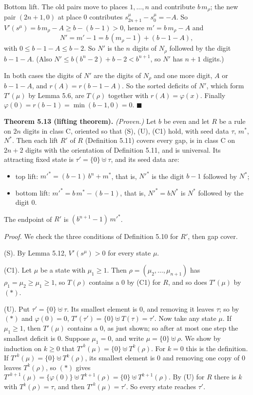 \documentclass[11pt,letterpaper]{article}
\providecommand{\tightlist}{%
  \setlength{\itemsep}{0pt}\setlength{\parskip}{0pt}}
\theoremstyle{paperstyle}
\theoremstyle{paperstyledef}
\theoremstyle{paperstylerem}
\begin{document}
Bottom lift. The old pairs move to places \(1, \dots, n\) and contribute \(b\, m_\rho\); the new pair \((2n+1, 0)\) at place \(0\) contributes \(s^\mu_{2n+1} - s^\mu_0 = -A\). So \(V'(s^\mu) = b\, m_\rho - A \ge b - (b-1) > 0\), hence \(m' = b\, m_\rho - A\) and \[N' = m' - 1 = b\,(m_\rho - 1) + (b - 1 - A),\] with \(0 \le b-1-A \le b-2\). So \(N'\) is the \(n\) digits of \(N_\rho\) followed by the digit \(b-1-A\). (Also \(N' \le b(b^n - 2) + b - 2 < b^{n+1}\), so \(N'\) has \(n+1\) digits.)

In both cases the digits of \(N'\) are the digits of \(N_\rho\) and one more digit, \(A\) or \(b-1-A\), and \(r(A) = r(b-1-A)\). So the sorted deficits of \(N'\), which form \(T'(\mu)\) by Lemma 5.6, are \(T(\rho)\) together with \(r(A) = \varphi(x)\). Finally \(\varphi(0) = r(b-1) = \min(b-1, 0) = 0\). \(\blacksquare\)

\textbf{Theorem 5.13 (lifting theorem).} \emph{(Proven.)} Let \(b\) be even and let \(R\) be a rule on \(2n\) digits in class C, oriented so that (S), (U), (C1) hold, with seed data \(\tau\), \(m^*\), \(N^*\). Then each lift \(R'\) of \(R\) (Definition 5.11) covers every gap, is in class C on \(2n+2\) digits with the orientation of Definition 5.11, and is universal. Its attracting fixed state is \(\tau' = \{0\} \uplus \tau\), and its seed data are:

\begin{itemize}
\tightlist
\item
  top lift: \(m'^* = (b-1)\, b^n + m^*\), that is, \(N'^*\) is the digit \(b-1\) followed by \(N^*\);
\item
  bottom lift: \(m'^* = b\, m^* - (b-1)\), that is, \(N'^* = b N^*\) is \(N^*\) followed by the digit \(0\).
\end{itemize}

The endpoint of \(R'\) is \((b^{n+1} - 1)\, m'^*\).

\emph{Proof.} We check the three conditions of Definition 5.10 for \(R'\), then gap cover.

(S). By Lemma 5.12, \(V'(s^\mu) > 0\) for every state \(\mu\).

(C1). Let \(\mu\) be a state with \(\mu_1 \ge 1\). Then \(\rho = (\mu_2, \dots, \mu_{n+1})\) has \(\rho_1 = \mu_2 \ge \mu_1 \ge 1\), so \(T(\rho)\) contains a \(0\) by (C1) for \(R\), and so does \(T'(\mu)\) by \((*)\).

(U). Put \(\tau' = \{0\} \uplus \tau\). Its smallest element is \(0\), and removing it leaves \(\tau\); so by \((*)\) and \(\varphi(0) = 0\), \(T'(\tau') = \{0\} \uplus T(\tau) = \tau'\). Now take any state \(\mu\). If \(\mu_1 \ge 1\), then \(T'(\mu)\) contains a \(0\), as just shown; so after at most one step the smallest deficit is \(0\). Suppose \(\mu_1 = 0\), and write \(\mu = \{0\} \uplus \rho\). We show by induction on \(k \ge 0\) that \(T'^k(\mu) = \{0\} \uplus T^k(\rho)\). For \(k = 0\) this is the definition. If \(T'^k(\mu) = \{0\} \uplus T^k(\rho)\), its smallest element is \(0\) and removing one copy of \(0\) leaves \(T^k(\rho)\), so \((*)\) gives \(T'^{k+1}(\mu) = \{\varphi(0)\} \uplus T^{k+1}(\rho) = \{0\} \uplus T^{k+1}(\rho)\). By (U) for \(R\) there is \(k\) with \(T^k(\rho) = \tau\), and then \(T'^k(\mu) = \tau'\). So every state reaches \(\tau'\).
\end{document}
